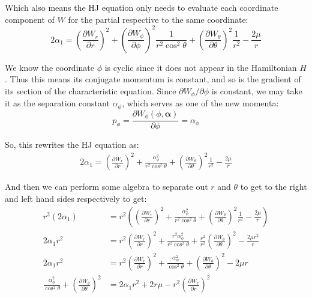 \documentclass[titlepage]{article}
\begin{document}
Which also means the HJ equation only needs to evaluate each coordinate component of $W$ for the partial respective to the same coordinate:
\begin{equation}
	2\alpha_1=\left(\frac{\partial W_r}{\partial r}\right)^2+\left(\frac{\partial W_\phi}{\partial\phi}\right)^2\frac{1}{r^2\cos^2\theta}+\left(\frac{\partial W_\theta}{\partial\theta}\right)^2\frac{1}{r^2}-\frac{2\mu}{r}
\end{equation}

We know the coordinate $\phi$ is cyclic since it does not appear in the Hamiltonian $H$. Thus this means its conjugate momentum is constant, and so is the gradient of its section of the characteristic equation. Since $\partial W_\phi/\partial\phi$ is constant, we may take it as the separation constant $\alpha_\phi$, which serves as one of the new momenta:
\begin{equation}
	p_\phi=\frac{\partial W_\phi(\phi,\boldsymbol{\alpha})}{\partial \phi}=\alpha_\phi
	\label{eq:alphaphi}
\end{equation}

So, this rewrites the HJ equation as:
\begin{equation}
	\begin{split}
		2\alpha_1=\left(\frac{\partial W_r}{\partial r}\right)^2+\frac{\alpha_\phi^2}{r^2\cos^2\theta}+\left(\frac{\partial W_\theta}{\partial\theta}\right)^2\frac{1}{r^2}-\frac{2\mu}{r}
	\end{split}
\end{equation}

And then we can perform some algebra to separate out $r$ and $\theta$ to get to the right and left hand sides respectively to get:
\begin{equation}
	\begin{split}
		r^2\left(2\alpha_1\right)&=r^2\left(\left(\frac{\partial W_r}{\partial r}\right)^2+\frac{\alpha_\phi^2}{r^2\cos^2\theta}+\left(\frac{\partial W_\theta}{\partial\theta}\right)^2\frac{1}{r^2}-\frac{2\mu}{r}\right)\\
		2\alpha_1 r^2&=r^2\left(\frac{\partial W_r}{\partial r}\right)^2+\frac{r^2\alpha_\phi^2}{r^2\cos^2\theta}+\frac{r^2}{r^2}\left(\frac{\partial W_\theta}{\partial\theta}\right)^2-\frac{2\mu r^2}{r}\\
		2\alpha_1 r^2&=r^2\left(\frac{\partial W_r}{\partial r}\right)^2+\frac{\alpha_\phi^2}{\cos^2\theta}+\left(\frac{\partial W_\theta}{\partial\theta}\right)^2-2\mu r\\
		\frac{\alpha_\phi^2}{\cos^2\theta}+\left(\frac{\partial W_\theta}{\partial\theta}\right)^2&=2\alpha_1r^2+2r\mu-r^2\left(\frac{\partial W_r}{\partial r}\right)^2
	\end{split}
\end{equation}
\end{document}
